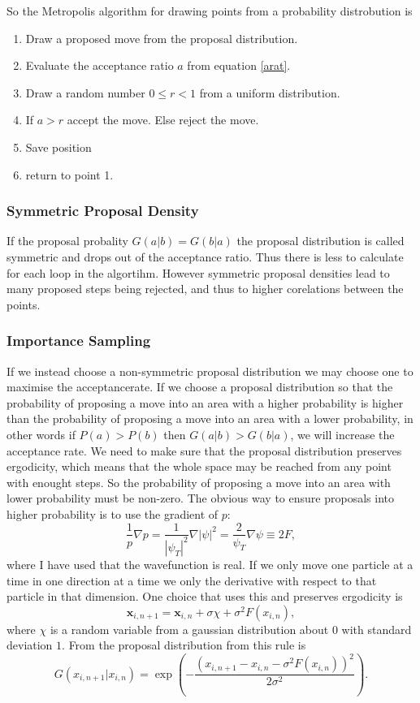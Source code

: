 \documentclass[a4paper,English,10pt]{article}
\newcommand{\bb}[1]{\boldsymbol{#1}}
\newcommand{\be}{\begin{equation}}
\newcommand{\ee}{\end{equation}}
\newcommand{\f}{\frac}
\begin{document}
So the Metropolis algorithm for drawing points from a probability distrobution is
\begin{enumerate}
\item
  Draw a proposed move from the proposal distribution.
\item
  Evaluate the acceptance ratio $a$ from equation \ref{arat}.
\item
  Draw a random number $0 \leq r < 1$ from a uniform distribution.
\item
  If $a>r$ accept the move. Else reject the move.
\item
  Save position
\item
  return to point 1.
\end{enumerate}
  
  

\subsubsection{Symmetric Proposal Density}

If the proposal probality $G(a|b) = G(b|a)$ the proposal distribution is called symmetric and drops out of the acceptance ratio.
Thus there is less to calculate for each loop in the algortihm. However symmetric proposal densities lead to many proposed steps being rejected,
and thus to higher corelations between the points.


\subsubsection{Importance Sampling}

If we instead choose a non-symmetric proposal distribution we may choose one to maximise the acceptancerate.
If we choose a proposal distribution so that the probability of proposing a move into an area with a higher probability is higher than
the probability of proposing a move into an area with a lower probability, in other words
if $P(a)>P(b)$ then $G(a|b)>G(b|a)$, we will increase the acceptance rate. We need to make sure that the proposal distribution preserves ergodicity,
which means that the whole space may be reached from any point with enought steps. So the probability of proposing a move into an area with lower probability must be non-zero.
The obvious way to ensure proposals into higher probability is to use the gradient of $p$:
\be
\f{1}{p}\nabla p = \f{1}{|\psi_T|^2}\nabla|\psi|^2 = \f{2}{\psi_T}\nabla\psi \equiv 2F, \label{eq:qforce} 
\ee
where I have used that the wavefunction is real. If we only move one particle at a time in one direction at a time we only the derivative with respect to
that particle in that dimension. 
One choice that uses this and preserves ergodicity is
\be
\bb{x}_{i,n+1} = \bb{x}_{i,n} + \sigma \chi + \sigma^2F(x_{i,n}),\label{eq:prop}
\ee
where $\chi$ is a random variable from a gaussian distribution about $0$ with standard deviation $1$.
From \cite{mortenbok} the proposal distribution from this rule is
\be
G(x_{i,n+1}|x_{i,n}) = \exp\left(-\f{(x_{i,n+1} - x_{i,n} - \sigma^2F(x_{i,n}))^2}{2\sigma^2}\right).
\ee
\end{document}
